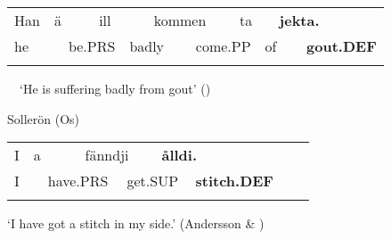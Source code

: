 \begin{tabular}{llllllllllll}
\lsptoprule
Han & \multicolumn{2}{l}{ä

} & \multicolumn{2}{l}{ill

} & \multicolumn{2}{l}{kommen

} & \multicolumn{2}{l}{ta

} & \multicolumn{2}{l}{{\bfseries jekta.}

} & \\
\multicolumn{2}{l}{he

} & \multicolumn{2}{l}{be.PRS

} & \multicolumn{2}{l}{badly

} & \multicolumn{2}{l}{come.PP

} & \multicolumn{2}{l}{of

} & \multicolumn{2}{l}{{\bfseries gout.DEF}

}\\
\lspbottomrule
\end{tabular}

\ \ ‘He is suffering badly from gout’ (\citet{Broberg1936})

\begin{listWWNumileveli}
\item {}

\begin{styleExample}
Sollerön (Os) 

\end{styleExample}

\end{listWWNumileveli}

\begin{tabular}{llllllllll}
\lsptoprule
I & \multicolumn{2}{l}{a

} & \multicolumn{2}{l}{fänndji

} & \multicolumn{2}{l}{{\bfseries ålldi.}

} & \multicolumn{2}{l}{} & \\
\multicolumn{2}{l}{I

} & \multicolumn{2}{l}{have.PRS

} & \multicolumn{2}{l}{get.SUP

} & \multicolumn{2}{l}{{\bfseries stitch.DEF}

} & \multicolumn{2}{l}{}\\
\lspbottomrule
\end{tabular}

\begin{styleTranslation}
‘I have got a stitch in my side.’ (Andersson \& \citet[285]{Danielsson1999})

\end{styleTranslation}

